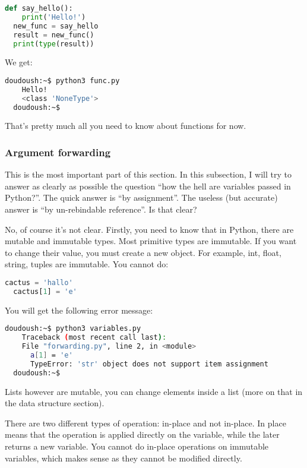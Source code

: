 \begin{lstlisting}[language=python]
  def say_hello():
    print('Hello!')
  new_func = say_hello
  result = new_func()
  print(type(result))
\end{lstlisting}

We get:
\begin{lstlisting}[language=bash]
  doudoush:~$ python3 func.py
    Hello!
    <class 'NoneType'>
  doudoush:~$
\end{lstlisting}

That's pretty much all you need to know about functions for now.

\subsubsection{Argument forwarding}

This is the most important part of this section. In this subsection, I will
try to answer as clearly as possible the question ``how the hell are variables
passed in Python?''. The quick answer is ``by assignment''. The useless (but accurate)
answer is ``by un-rebindable reference''. Is that clear?

\vspace{5mm}

No, of course it's not clear. Firstly, you need to know that in
Python, there are mutable and immutable types. Most primitive types
are immutable. If you want to change their value, you must create a
new object. For example, int, float, string, tuples are immutable. You
cannot do:

\begin{lstlisting}[language=python]
  cactus = 'hallo'
  cactus[1] = 'e'
\end{lstlisting}

You will get the following error message:

\begin{lstlisting}[language=bash]
  doudoush:~$ python3 variables.py
    Traceback (most recent call last):
    File "forwarding.py", line 2, in <module>
      a[1] = 'e'
      TypeError: 'str' object does not support item assignment
  doudoush:~$
\end{lstlisting}

Lists however are mutable, you can change elements inside a list
(more on that in the data structure section).

\vspace{5mm}

There are two different types of operation: in-place and not in-place.
In place means that the operation is applied directly on the variable, while the later
returns a new variable. You cannot do in-place operations on immutable variables,
which makes sense as they cannot be modified directly.

